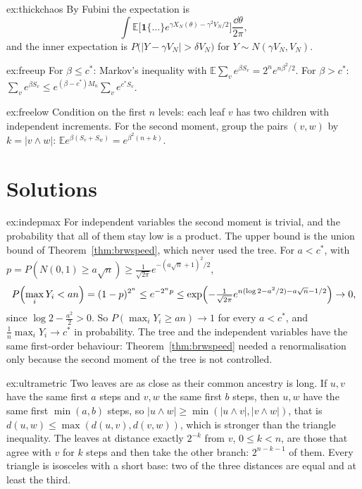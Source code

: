 \begin{hint}{ex:thickchaos}
By Fubini the expectation is
\[
\int\mathbb E\bigl[\mathbf 1\{\dots\}e^{\gamma X_N(\theta)-\gamma^2V_N/2}\bigr]\frac{\dd\theta}{2\pi},
\]
and the inner expectation is $P\bigl(|Y-\gamma V_N|>\delta V_N\bigr)$ for $Y\sim N(\gamma V_N,V_N)$.
\end{hint}

\begin{hint}{ex:freeup}
For $\beta\le c^*$: Markov's inequality with $\mathbb E\sum_ve^{\beta S_v}=2^ne^{n\beta^2/2}$. For $\beta>c^*$: $\sum_ve^{\beta S_v}\le e^{(\beta-c^*)M_n}\sum_ve^{c^*S_v}$.
\end{hint}

\begin{hint}{ex:freelow}
Condition on the first $n$ levels: each leaf $v$ has two children with independent increments. For the second moment, group the pairs $(v,w)$ by $k=|v\wedge w|$: $\mathbb Ee^{\beta(S_v+S_w)}=e^{\beta^2(n+k)}$.
\end{hint}

\section{Solutions}

\begin{solution}{ex:indepmax}
\idea For independent variables the second moment is trivial, and the probability that all of them stay low is a product.
\writeup The upper bound is the union bound of Theorem~\ref{thm:brwspeed}, which never used the tree. For $a<c^*$, with $p=P(N(0,1)\ge a\sqrt n)\ge\frac1{\sqrt{2\pi}}e^{-(a\sqrt n+1)^2/2}$,
\[
P\Bigl(\max_iY_i<an\Bigr)=(1-p)^{2^n}\le e^{-2^np}\le\exp\Bigl(-\tfrac1{\sqrt{2\pi}}e^{n(\log2-a^2/2)-a\sqrt n-1/2}\Bigr)\to0,
\]
since $\log2-\frac{a^2}2>0$. So $P(\max_iY_i\ge an)\to1$ for every $a<c^*$, and $\frac1n\max_iY_i\to c^*$ in probability. The tree and the independent variables have the same first-order behaviour: Theorem~\ref{thm:brwspeed} needed a
renormalisation only because the second moment of the tree is not controlled.
\end{solution}

\begin{solution}{ex:ultrametric}
\idea Two leaves are as close as their common ancestry is long.
\writeup If $u,v$ have the same first $a$ steps and $v,w$ the same first $b$ steps, then $u,w$ have the same first $\min(a,b)$ steps, so $|u\wedge w|\ge\min(|u\wedge v|,|v\wedge w|)$, that is $d(u,w)\le\max(d(u,v),d(v,w))$, which is stronger
than the triangle inequality. The leaves at distance exactly $2^{-k}$ from $v$, $0\le k<n$, are those that agree with $v$ for $k$ steps and then take the other branch: $2^{n-k-1}$ of them. Every triangle is isosceles with a short base:
two of the three distances are equal and at least the third.
\end{solution}

